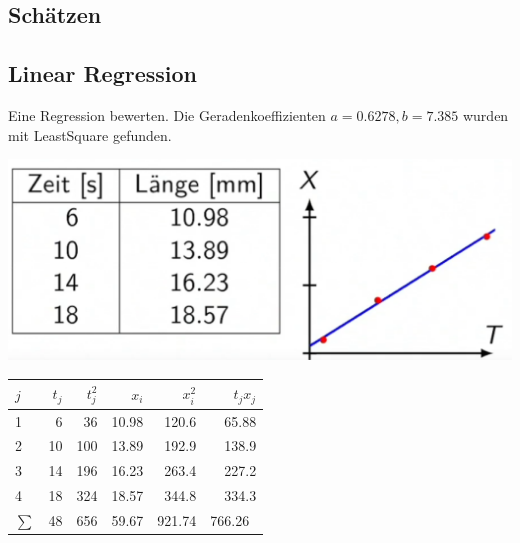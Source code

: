 \subsection{Schätzen}\label{konf_intervall}


\subsection{Linear Regression}\label{covarianz_eg}\label{regression}
Eine Regression bewerten. Die Geradenkoeffizienten $ a= 0.6278, b = 7.385$ wurden mit LeastSquare gefunden.
\begin{center}
	\includegraphics[width=0.5\columnwidth]{Images/regression}
\end{center}

\begin{center}
	\begin{tabular}{l|rr|rr|r}
		$j$ & $t_j$ & $t^2_j$ & $x_i$ & $x_i^2$ & $t_jx_j$ \\ \toprule
		1 & 6 & 36 & 10.98 & 120.6 & 65.88 \\  \midrule
		2 & 10 & 100 & 13.89 & 192.9 & 138.9 \\  \midrule
		3 & 14 & 196 & 16.23 & 263.4 & 227.2\\  \midrule
		4 & 18 & 324 & 18.57 & 344.8 & 334.3 \\  \bottomrule
		$\sum$  & 48 & 656 &  59.67 & 921.74 & 766.26\
	\end{tabular}
\end{center}

